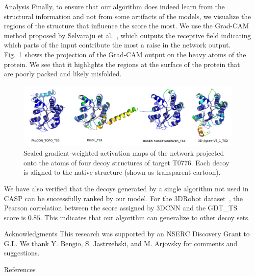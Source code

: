\documentclass[final, unknownkeysallowed]{beamer}
\begin{document}
\begin{frame}{}
\begin{textblock}{39.0}
\begin{block}{Analysis}
\vspace{0.5cm}
Finally, to ensure that our algorithm does indeed learn from the
structural information and not from some artifacts of the models, we
visualize the regions of the structure that influence the score the
most.  We use the Grad-CAM method proposed by Selvaraju et
al.~\cite{selvaraju2016grad}, which outputs the receptive field
indicating which parts of the input contribute the most a raise in the
network output.  Fig.~\ref{Fig:GradCAMT0776_more} shows the projection
of the Grad-CAM output on the heavy atoms of the protein.  We see that
it highlights the regions at the surface of the protein that are
poorly packed and likely misfolded.

\begin{figure}[H]
    \centering
    \includegraphics[width=\linewidth]{../draft/Fig/T0776.png}
    \captionsetup{width=0.8\linewidth}
    \caption{Scaled gradient-weighted activation maps of the network
      projected onto the atoms of four decoy structures of target
      T0776. Each decoy is aligned to the native structure (shown as
      transparent cartoon).}
    \label{Fig:GradCAMT0776_more}
\end{figure}

We have also verified that the decoys generated by a single algorithm
not used in CASP can be successfully ranked by our model.  For the
3DRobot dataset~\cite{deng20163drobot}, the Pearson correlation
between the score assigned by 3DCNN and the GDT\_TS score is
$0.85$. This indicates that our algorithm can generalize to other
decoy sets.

\end{block}

\begin{block}{Acknowledgments}
This research was supported by an NSERC Discovery Grant to G.L.  We
thank Y. Bengio, S. Jastrzebski, and M. Arjovsky for comments and
suggestions.
\end{block}

\begin{block}{References}
{\footnotesize
{}}

\end{block}

\end{textblock}

\end{frame}
\end{document}
